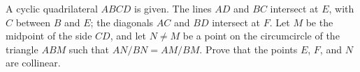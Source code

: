 A cyclic quadrilateral $ABCD$ is given. The lines $AD$ and $BC$ intersect at $E$, with $C$ between $B$ and $E$; the diagonals $AC$ and $BD$ intersect at $F$. Let $M$ be the midpoint of the side $CD$, and let $N \neq M$ be a point on the circumcircle of the triangle $ABM$ such that $AN/BN = AM/BM$. Prove that the points $E$, $F$, and $N$ are collinear.
